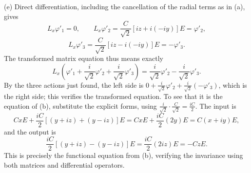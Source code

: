 (e) Direct differentiation, including the cancellation of the radial
terms as in (a), gives
\[
L_x\varphi'_1=0,\qquad
L_x\varphi'_2=\frac C{\sqrt2}[iz+i(-iy)]E=\varphi'_2,
\]
\[
L_x\varphi'_3=\frac C{\sqrt2}[iz-i(-iy)]E=-\varphi'_3.
\]
The transformed matrix equation thus means exactly
\[
L_x\left(\varphi'_1+\frac i{\sqrt2}\varphi'_2
                    +\frac i{\sqrt2}\varphi'_3\right)
=\frac i{\sqrt2}\varphi'_2-\frac i{\sqrt2}\varphi'_3.
\]
By the three actions just found, the left side is
$0+\frac i{\sqrt2}\varphi'_2+\frac i{\sqrt2}(-\varphi'_3)$, which is the
right side; this verifies the transformed equation. To see that it is
the equation of (b), substitute the explicit forms, using
$\frac i{\sqrt2}\cdot\frac C{\sqrt2}=\frac{iC}2$. The input is
\[
CxE+\frac{iC}{2}[(y+iz)+(y-iz)]E=CxE+\frac{iC}2(2y)E=C(x+iy)E,
\]
and the output is
\[
\frac{iC}{2}[(y+iz)-(y-iz)]E=\frac{iC}2(2iz)E=-CzE.
\]
This is precisely the functional equation from (b), verifying the
invariance using both matrices and differential operators.
